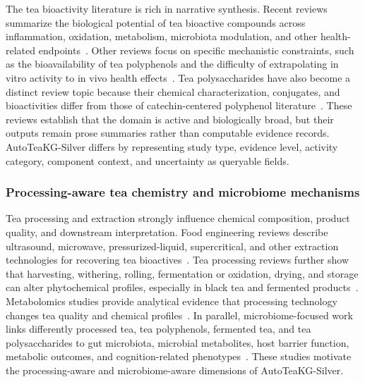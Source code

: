 \documentclass[11pt]{article}
\begin{document}
The tea bioactivity literature is rich in narrative synthesis. Recent reviews summarize the biological potential of tea bioactive compounds across inflammation, oxidation, metabolism, microbiota modulation, and other health-related endpoints~\cite{luo2024tea_bioactive_review}. Other reviews focus on specific mechanistic constraints, such as the bioavailability of tea polyphenols and the difficulty of extrapolating in vitro activity to in vivo health effects~\cite{yang2025bioavailability_tea_polyphenols}. Tea polysaccharides have also become a distinct review topic because their chemical characterization, conjugates, and bioactivities differ from those of catechin-centered polyphenol literature~\cite{rashwan2025tea_polysaccharides_review}. These reviews establish that the domain is active and biologically broad, but their outputs remain prose summaries rather than computable evidence records. AutoTeaKG-Silver differs by representing study type, evidence level, activity category, component context, and uncertainty as queryable fields.

\subsubsection{Processing-aware tea chemistry and microbiome mechanisms}

Tea processing and extraction strongly influence chemical composition, product quality, and downstream interpretation. Food engineering reviews describe ultrasound, microwave, pressurized-liquid, supercritical, and other extraction technologies for recovering tea bioactives~\cite{raghunath2023tea_extraction_review}. Tea processing reviews further show that harvesting, withering, rolling, fermentation or oxidation, drying, and storage can alter phytochemical profiles, especially in black tea and fermented products~\cite{aaqil2023black_tea_processing_review}. Metabolomics studies provide analytical evidence that processing technology changes tea quality and chemical profiles~\cite{wang2024processing_metabolomics}. In parallel, microbiome-focused work links differently processed tea, tea polyphenols, fermented tea, and tea polysaccharides to gut microbiota, microbial metabolites, host barrier function, metabolic outcomes, and cognition-related phenotypes~\cite{zhao2024processed_tea_microbiota,song2024oolong_neuroprotection,tian2024obesity_microbiota,zhang2024fermented_tea_microbiota,arce2025kombucha_rct}. These studies motivate the processing-aware and microbiome-aware dimensions of AutoTeaKG-Silver.
\end{document}
